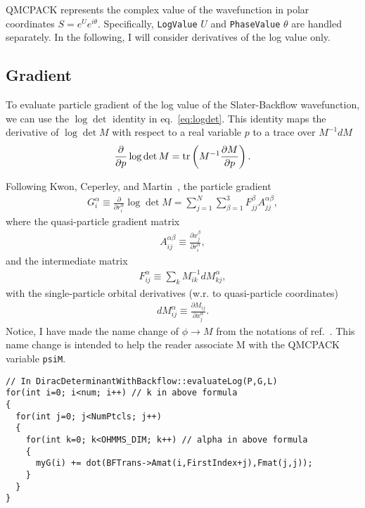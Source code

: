 QMCPACK represents the complex value of the wavefunction in polar coordinates $S=e^Ue^{i\theta}$. Specifically, \verb|LogValue| $U$ and \verb|PhaseValue| $\theta$ are handled separately. In the following, I will consider derivatives of the log value only.

\subsection{Gradient}
To evaluate particle gradient of the log value of the Slater-Backflow wavefunction, we can use the $\log\det$ identity in eq.~\ref{eq:logdet}. This identity maps the derivative of $\log\det M$ with respect to a real variable $p$ to a trace over $M^{-1}dM$
\begin{align}
\frac{\partial}{\partial p}\log\det M = \text{tr}\left( M^{-1} \frac{\partial M}{\partial p} \right) \label{eq:logdet}.
\end{align}

Following Kwon, Ceperley, and Martin~\cite{Kwon1993backflow}, the particle gradient
\begin{align}
G_i^\alpha \equiv \frac{\partial}{\partial r_i^\alpha} \log\det M = \sum\limits_{j=1}^N \sum\limits_{\beta=1}^3 F_{jj}^\beta A_{jj}^{\alpha\beta}, \label{eq:grad}
\end{align}
where the quasi-particle gradient matrix
\begin{align}
A_{ij}^{\alpha\beta} \equiv \frac{\partial x_j^\beta}{\partial r_i^\alpha},
\end{align}
and the intermediate matrix
\begin{align}
F_{ij}^\alpha\equiv\sum\limits_k M^{-1}_{ik} dM_{kj}^\alpha,
\end{align}
with the single-particle orbital derivatives (w.r. to quasi-particle coordinates)
\begin{align}
dM_{ij}^\alpha \equiv \frac{\partial M_{ij}}{\partial x_j^\alpha}.
\end{align}
Notice, I have made the name change of $\phi\rightarrow M$ from the notations of ref.~\cite{Kwon1993backflow}. This name change is intended to help the reader associate M with the QMCPACK variable \verb|psiM|.
\begin{lstlisting}
// In DiracDeterminantWithBackflow::evaluateLog(P,G,L)
for(int i=0; i<num; i++) // k in above formula
{
  for(int j=0; j<NumPtcls; j++)
  {
    for(int k=0; k<OHMMS_DIM; k++) // alpha in above formula
    {
      myG(i) += dot(BFTrans->Amat(i,FirstIndex+j),Fmat(j,j));
    }
  }
}
\end{lstlisting}

